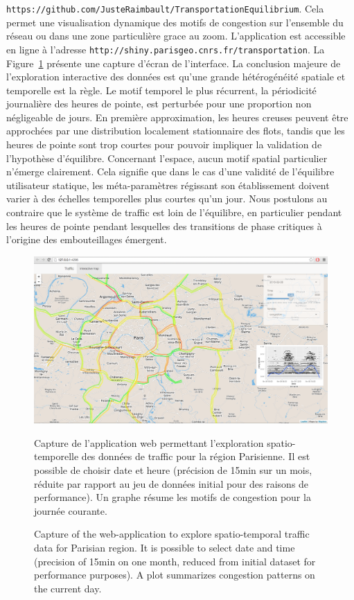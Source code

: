 {{\texttt{https://github.com/JusteRaimbault/TransportationEquilibrium}}.
Cela permet une visualisation dynamique des motifs de congestion sur l'ensemble du réseau ou dans une zone particulière grace au zoom. L'application est accessible en ligne à l'adresse \texttt{http://shiny.parisgeo.cnrs.fr/transportation}. La Figure~\ref{fig:fig-1} présente une capture d'écran de l'interface. La conclusion majeure de l'exploration interactive des données est qu'une grande hétérogénéité spatiale et temporelle est la règle. Le motif temporel le plus récurrent, la périodicité journalière des heures de pointe, est perturbée pour une proportion non négligeable de jours. En première approximation, les heures creuses peuvent être approchées par une distribution localement stationnaire des flots, tandis que les heures de pointe sont trop courtes pour pouvoir impliquer la validation de l'hypothèse d'équilibre. Concernant l'espace, aucun motif spatial particulier n'émerge clairement. Cela signifie que dans le cas d'une validité de l'équilibre utilisateur statique, les méta-paramètres régissant son établissement doivent varier à des échelles temporelles plus courtes qu'un jour. Nous postulons au contraire que le système de traffic est loin de l'équilibre, en particulier pendant les heures de pointe pendant lesquelles des transitions de phase critiques à l'origine des embouteillages émergent.
}
 


\begin{figure}
\vspace{1cm}
\centering
\includegraphics[width=\textwidth]{Figures/TransportationEquilibrium/gr1}
\caption{Capture of the web-application to explore spatio-temporal traffic data for Parisian region. It is possible to select date and time (precision of 15min on one month, reduced from initial dataset for performance purposes). A plot summarizes congestion patterns on the current day.}{Capture de l'application web permettant l'exploration spatio-temporelle des données de traffic pour la région Parisienne. Il est possible de choisir date et heure (précision de 15min sur un mois, réduite par rapport au jeu de données initial pour des raisons de performance). Un graphe résume les motifs de congestion pour la journée courante.}
\label{fig:fig-1}
\end{figure}



